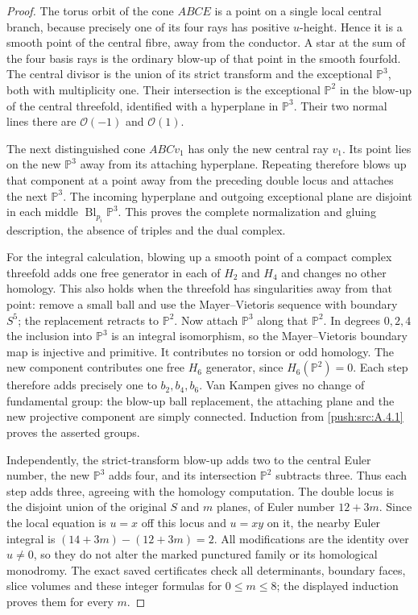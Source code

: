 \begin{proof}
The torus orbit of the cone $ABCE$ is a point on a single
local central branch, because precisely one of its four
rays has positive $u$-height. Hence it is a smooth point
of the central fibre, away from the conductor. A star at
the sum of the four basis rays is the ordinary blow-up
of that point in the smooth fourfold. The central divisor
is the union of its strict transform and the exceptional
$\mathbb P^3$, both with multiplicity one. Their
intersection is the exceptional $\mathbb P^2$ in the
blow-up of the central threefold, identified with a
hyperplane in $\mathbb P^3$. Their two normal lines there
are $\mathcal O(-1)$ and $\mathcal O(1)$.

The next distinguished cone $ABCv_1$ has only the new
central ray $v_1$. Its point lies on the new $\mathbb P^3$
away from its attaching hyperplane. Repeating therefore
blows up that component at a point away from the preceding
double locus and attaches the next $\mathbb P^3$. The
incoming hyperplane and outgoing exceptional plane are
disjoint in each middle $\operatorname{Bl}_{p_i}\mathbb P^3$.
This proves the complete normalization and gluing
description, the absence of triples and the dual complex.

For the integral calculation, blowing up a smooth point
of a compact complex threefold adds one free generator
in each of $H_2$ and $H_4$ and changes no other homology.
This also holds when the threefold has singularities away
from that point: remove a small ball and use the
Mayer--Vietoris sequence with boundary $S^5$; the
replacement retracts to $\mathbb P^2$. Now attach
$\mathbb P^3$ along that $\mathbb P^2$. In degrees
$0,2,4$ the inclusion into $\mathbb P^3$ is an integral
isomorphism, so the Mayer--Vietoris boundary map is
injective and primitive. It contributes no torsion or
odd homology. The new component contributes one free
$H_6$ generator, since $H_6(\mathbb P^2)=0$. Each step
therefore adds precisely one to $b_2,b_4,b_6$.
Van Kampen gives no change of fundamental group: the
blow-up ball replacement, the attaching plane and the
new projective component are simply connected.
Induction from \ref{push:src:A.4.1} proves the asserted groups.

Independently, the strict-transform blow-up adds two to
the central Euler number, the new $\mathbb P^3$ adds
four, and its intersection $\mathbb P^2$ subtracts
three. Thus each step adds three, agreeing with the
homology computation. The double locus is the disjoint
union of the original $S$ and $m$ planes, of Euler number
$12+3m$. Since the local equation is $u=x$ off this locus
and $u=xy$ on it, the nearby Euler integral is
$(14+3m)-(12+3m)=2$. All modifications are the identity
over $u\ne0$, so they do not alter the marked punctured
family or its homological monodromy. The exact saved
certificates check all determinants, boundary faces,
slice volumes and these integer formulas for $0\leq m\leq8$;
the displayed induction proves them for every $m$.
\end{proof}

